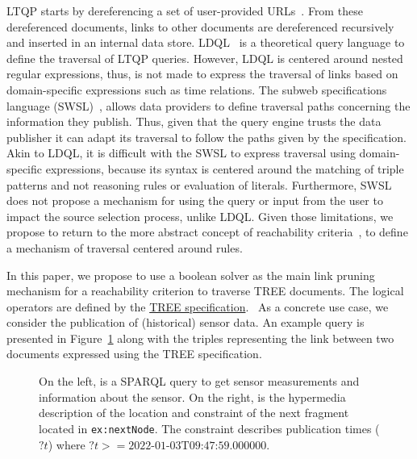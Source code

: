 LTQP starts by dereferencing a set of user-provided URLs~\cite{Hartig2016}.
From these dereferenced documents, links to other documents are dereferenced recursively and inserted in an internal data store.
LDQL~\cite{hartig2016Ldql} is a theoretical query language to define the traversal of LTQP queries.
However, LDQL is centered around nested regular expressions, thus, is not made to express the traversal of links based on domain-specific expressions
such as time relations.
The subweb specifications language (SWSL)~\cite{bogaerts_rulemlrr_2021}, allows data providers to define traversal paths concerning the information they publish.
Thus, given that the query engine trusts the data publisher it can adapt its traversal to follow the paths given by the specification.
Akin to LDQL, it is difficult with the SWSL to express traversal using domain-specific expressions, because its syntax is centered around the matching of triple patterns and not reasoning rules or evaluation of literals.
Furthermore, SWSL does not propose a mechanism for using the query or input from the user to impact the source selection process, unlike LDQL.
Given those limitations, we propose to return to the more abstract concept of reachability criteria~\cite{hartig2012},
to define a mechanism of traversal centered around rules.

In this paper, we propose to use a boolean solver as the main link pruning mechanism for a reachability criterion to traverse TREE documents.
The logical operators are defined by the \href{https://treecg.github.io/specification/}{TREE specification}.~
As a concrete use case, we consider the publication of (historical) sensor data.
An example query is presented in Figure~\ref{lst:system} along with the triples representing the link between two documents expressed using the TREE specification.

\begin{figure}[h]
    \begin{minipage}{0.50\textwidth}
        \centering
        
    \end{minipage}
    \hspace{0.05\textwidth}
    \begin{minipage}{0.43\textwidth}
        \centering
        
    \end{minipage}
    \caption{On the left, is a SPARQL query to get sensor measurements and information about the sensor.
    On the right, is the hypermedia description of the location and constraint of the next fragment located in \texttt{ex:nextNode}.
    The constraint describes publication times ($?t$) where $?t>= \text{2022-01-03T09:47:59.000000}$.}
        \label{lst:system}
    \vspace*{-0.90cm}
\end{figure}